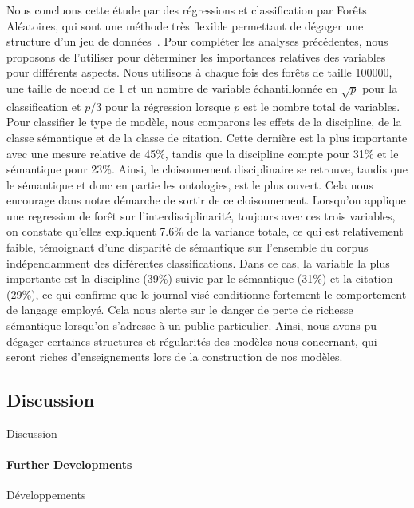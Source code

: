 Nous concluons cette étude par des régressions et classification par Forêts Aléatoires, qui sont une méthode très flexible permettant de dégager une structure d'un jeu de données~\cite{liaw2002classification}. Pour compléter les analyses précédentes, nous proposons de l'utiliser pour déterminer les importances relatives des variables pour différents aspects. Nous utilisons à chaque fois des forêts de taille 100000, une taille de noeud de 1 et un nombre de variable échantillonnée en $\sqrt{p}$ pour la classification et $p/3$ pour la régression lorsque $p$ est le nombre total de variables. Pour classifier le type de modèle, nous comparons les effets de la discipline, de la classe sémantique et de la classe de citation. Cette dernière est la plus importante avec une mesure relative de 45\%, tandis que la discipline compte pour 31\% et le sémantique pour 23\%. Ainsi, le cloisonnement disciplinaire se retrouve, tandis que le sémantique et donc en partie les ontologies, est le plus ouvert. Cela nous encourage dans notre démarche de sortir de ce cloisonnement. Lorsqu'on applique une regression de forêt sur l'interdisciplinarité, toujours avec ces trois variables, on constate qu'elles expliquent 7.6\% de la variance totale, ce qui est relativement faible, témoignant d'une disparité de sémantique sur l'ensemble du corpus indépendamment des différentes classifications. Dans ce cas, la variable la plus importante est la discipline (39\%) suivie par le sémantique (31\%) et la citation (29\%), ce qui confirme que le journal visé conditionne fortement le comportement de langage employé. Cela nous alerte sur le danger de perte de richesse sémantique lorsqu'on s'adresse à un public particulier. Ainsi, nous avons pu dégager certaines structures et régularités des modèles nous concernant, qui seront riches d'enseignements lors de la construction de nos modèles.



\subsection{Discussion}{Discussion}


\paragraph{Further Developments}{Développements}

